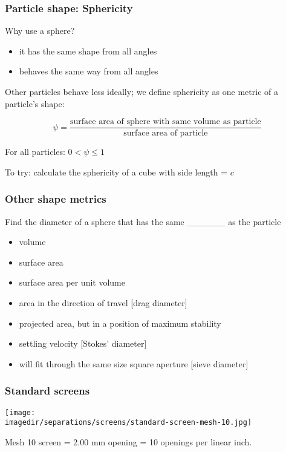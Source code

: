 \begin{frame}\frametitle{Particle shape: Sphericity}
	Why use a sphere?
	\begin{itemize}
		\item	it has the same shape from all angles
		\item	behaves the same way from all angles
	\end{itemize}
	
	Other particles behave less ideally; we define sphericity as one metric of a particle's shape:
	
	
	\[
		\psi = \frac{\text{surface area of sphere with same volume as particle}}{\text{surface area of particle}}
	\]
	
	\vspace{12pt}
	For all particles: \( 0 < \psi \leq 1 \)
	
	\vspace{12pt}
	To try: calculate the sphericity of a cube with side length = $c$ \\ {\scriptsize {\color{myGreen}{Answer: $\psi = 0.806$}}}	
\end{frame}

\begin{frame}\frametitle{Other shape metrics}
	Find the diameter of a sphere that has the same \_\_\_\_\_\_ as the particle
	\begin{itemize}
		\item	volume
		\item	surface area
		\item	surface area per unit volume
		\item	area in the direction of travel [drag diameter]
		\item	projected area, but in a position of maximum stability
		\item	settling velocity [Stokes' diameter]
		\item	will fit through the same size square aperture  [sieve diameter]
	\end{itemize}
\end{frame}

\begin{frame}\frametitle{Standard screens}
	\begin{center}
		\texttt{[image: \\imagedir/separations/screens/standard-screen-mesh-10.jpg]}
	\end{center}
	Mesh 10 screen = 2.00 mm opening = 10 openings per linear inch.
\end{frame}

